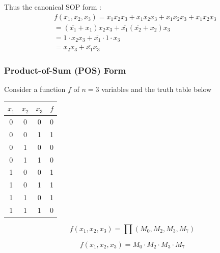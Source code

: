 \documentclass[12pt,openany, tikz,border=10pt]{book}
\begin{document}
			      	Thus the canonical SOP form :
			      	\begin{align*}
			      		  & f(x_1, x_2, x_3) = \overline{x_1} \overline{x_2} x_3 + x_1 \overline{x_2} \overline{x_3} + x_1 \overline{x_2} x_3 + x_1 x_2 \overline{x_3} \\
			      		  & = (\overline{x_1} + x_1) x_2 x_3 + \overline{x_1} (\overline{x_2} + x_2) x_3                                                               \\
			      		  & = 1 \cdot x_2 x_3 + \overline{x_1} \cdot 1 \cdot x_3                                                                                       \\
			      		  & = x_2 x_3 + \overline{x_1} x_3                                                                                                             
			      	\end{align*}
			      	
			      	
			      	\subsubsection{Product-of-Sum (POS) Form}
			      	Consider a function \( f \) of \( n = 3 \) variables and the truth table below
			      	\begin{center}
			      		\begin{tabular}{ccc|c}
			      			\( x_1 \) & \( x_2 \) & \( x_3 \) & \( f \) \\
			      			\hline
			      			0         & 0         & 0         & 0       \\
			      			0         & 0         & 1         & 1       \\
			      			0         & 1         & 0         & 0       \\
			      			0         & 1         & 1         & 0       \\
			      			1         & 0         & 0         & 1       \\
			      			1         & 0         & 1         & 1       \\
			      			1         & 1         & 0         & 1       \\
			      			1         & 1         & 1         & 0       \\
			      		\end{tabular}
			      	\end{center}
			      	\[
			      		f(x_1, x_2, x_3) = \prod (M_0, M_2, M_3, M_7)
			      	\]
			      	
			      	\[
			      		f(x_1, x_2, x_3) = M_0 \cdot M_2 \cdot M_3 \cdot M_7
			      	\]
			      	
\end{document}
